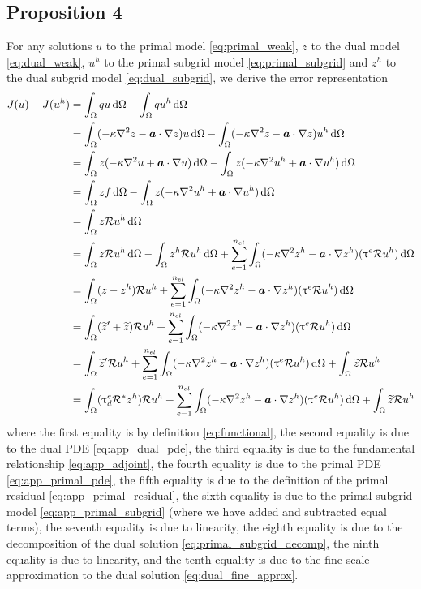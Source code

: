 \subsection{Proposition 4}

For any solutions $u$ to the primal model \eqref{eq:primal_weak},
$z$ to the dual model \eqref{eq:dual_weak}, $u^h$ to the primal
subgrid model \eqref{eq:primal_subgrid} and $z^h$ to the dual
subgrid model \eqref{eq:dual_subgrid}, we derive the error
representation
%
\begin{gather*}
\begin{aligned}
J(u) - J(u^h)
&=
\int_{\Omega} q u \, \text{d} \Omega -
\int_{\Omega} q u^h \, \text{d} \Omega \\
&=
\int_{\Omega} (-\kappa \nabla^2 {z} - \boldsymbol{a} \cdot \nabla {z}) u \, \text{d} \Omega -
\int_{\Omega} (-\kappa \nabla^2 {z} - \boldsymbol{a} \cdot \nabla {z}) u^h \, \text{d} \Omega \\
& =
\int_{\Omega} z (-\kappa \nabla^2 {u} + \boldsymbol{a} \cdot \nabla {u}) \, \text{d} \Omega -
\int_{\Omega} z (-\kappa \nabla^2 {u^h} + \boldsymbol{a} \cdot \nabla {u^h}) \, \text{d} \Omega \\
&=
\int_{\Omega} z f \, \text{d} \Omega -
\int_{\Omega} z (-\kappa \nabla^2 {u^h} + \boldsymbol{a} \cdot \nabla {u^h}) \, \text{d} \Omega \\
&=
\int_{\Omega} z \mathcal{R} u^h \, \text{d} \Omega \\
&=
\int_{\Omega} z \mathcal{R} u^h \, \text{d} \Omega -
\int_{\Omega} z^h \mathcal{R} u^h \, \text{d} \Omega +
\sum_{e=1}^{n_{el}} \int_{\Omega} (-\kappa \nabla^2 {z^h} - \boldsymbol{a} \cdot \nabla {z^h})(\uptau^e \mathcal{R} u^h)
\, \text{d} \Omega \\
&=
\int_{\Omega} (z - z^h) \mathcal{R} u^h +
\sum_{e=1}^{n_{el}} \int_{\Omega} (-\kappa \nabla^2 {z^h} - \boldsymbol{a} \cdot \nabla {z^h})(\uptau^e \mathcal{R} u^h)
\, \text{d} \Omega \\
&=
\int_{\Omega} (\widetilde{z}' + \widetilde{z}) \mathcal{R} u^h +
\sum_{e=1}^{n_{el}} \int_{\Omega} (-\kappa \nabla^2 {z^h} - \boldsymbol{a} \cdot \nabla {z^h})(\uptau^e \mathcal{R} u^h)
\, \text{d} \Omega \\
&=
\int_{\Omega} \widetilde{z}' \mathcal{R} u^h +
\sum_{e=1}^{n_{el}} \int_{\Omega} (-\kappa \nabla^2 {z^h} - \boldsymbol{a} \cdot \nabla {z^h})(\uptau^e \mathcal{R} u^h)
\, \text{d} \Omega +
\int_{\Omega} \widetilde{z} \mathcal{R} u^h \\
&=
\int_{\Omega} (\uptau^e_d \mathcal{R}^* z^h) \mathcal{R} u^h +
\sum_{e=1}^{n_{el}} \int_{\Omega} (-\kappa \nabla^2 {z^h} - \boldsymbol{a} \cdot \nabla {z^h})(\uptau^e \mathcal{R} u^h)
\, \text{d} \Omega +
\int_{\Omega} \widetilde{z} \mathcal{R} u^h
\end{aligned}
\end{gather*}
%
where the first equality is by definition \eqref{eq:functional},
the second equality is due to the dual PDE
\eqref{eq:app_dual_pde}, the third equality is due to the
fundamental relationship \eqref{eq:app_adjoint},
the fourth equality is due to the primal PDE
\eqref{eq:app_primal_pde}, the fifth equality is due to
the definition of the primal residual \eqref{eq:app_primal_residual},
the sixth equality is due to the primal subgrid model
\eqref{eq:app_primal_subgrid} (where we have added and
subtracted equal terms), the seventh equality is due to
linearity, the eighth equality is due to the decomposition
of the dual solution \eqref{eq:primal_subgrid_decomp},
the ninth equality is due to linearity, and the tenth equality
is due to the fine-scale approximation to the dual solution
\eqref{eq:dual_fine_approx}.

